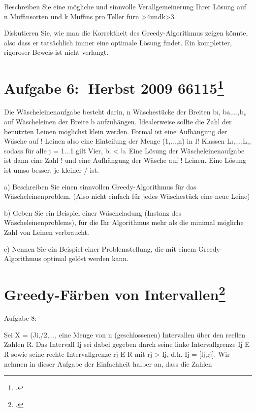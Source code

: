 \documentclass{lehramt-informatik}
\begin{document}
\begin{enumerate}
Beschreiben Sie eine mögliche und sinnvolle Verallgemeinerung Ihrer Lösung auf n Muffinsorten und k Muffins pro Teller fürn >4undk>3.

Diskutieren Sie, wie man die Korrektheit des Greedy-Algorithmus zeigen könnte, also dass
er tatsächlich immer eine optimale Lösung findet. Ein kompletter, rigoroser Beweis ist nicht
verlangt.

%

\section{Aufgabe 6: Herbst 2009  66115\footcite{examen:66115:2009:09}}

Die Wäscheleinenaufgabe besteht darin, n Wäschestücke der Breiten bı, ba,...,b„ auf Wäscheleinen der Breite b aufzuhängen. Idealerweise sollte die Zahl der benutzten Leinen möglichst klein
werden. Formal ist eine Aufhängung der Wäsche auf ! Leinen also eine Einteilung der Menge
(1,...,n) in I! Klassen Lı,...,L,, sodass für alle j = 1...1 gilt Vier, b; < b. Eine Lösung der
Wäscheleinenaufgabe ist dann eine Zahl ! und eine Aufhängung der Wäsche auf ! Leinen. Eine
Lösung ist umso besser, je kleiner / ist.

a) Beschreiben Sie einen sinnvollen Greedy-Algorithmus für das Wäscheleinenproblem. (Also
nicht einfach für jedes Wäschestück eine neue Leine)

b) Geben Sie ein Beispiel einer Wäscheladung (Instanz des Wäscheleinenproblems), für die Ihr
Algorithmus mehr als die minimal mögliche Zahl von Leinen verbraucht.

c) Nennen Sie ein Beispiel einer Problemstellung, die mit einem Greedy-Algorithmus optimal
gelöst werden kann.

%

\section{Greedy-Färben von Intervallen\footcite{examen:66115:2017:09}}

Aufgabe 8:

Sei X = (Ji,/2,...,
eine Menge von n (geschlossenen) Intervallen über den reellen Zahlen
R. Das Intervall Ij sei dabei gegeben dnrch seine linke Intervallgrenze Ij E R sowie seine rechte
Intervallgrenze rj E R mit rj > Ij, d.h. Ij = [lj,rj].
Wir nehmen in dieser Aufgabe der Einfachheit halber an, dass die Zahlen


\end{enumerate}
\end{document}
